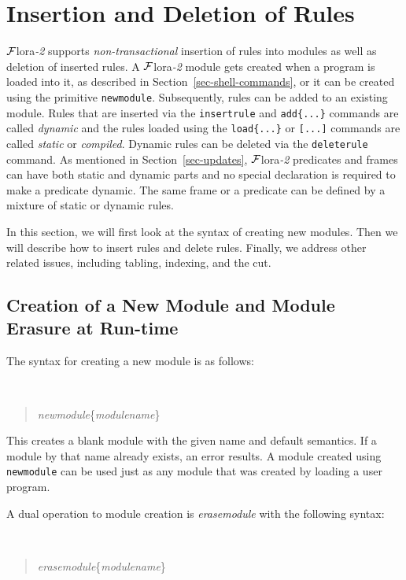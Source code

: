 \documentclass[11pt]{article}
\newcommand{\FLSYSTEM}{{\mbox{\sc ${\cal F}${lora}\rm\emph{-2}}}\xspace}
\begin{document}
\section{Insertion and Deletion of Rules}
\label{sec-rule-update}

\FLSYSTEM supports \emph{non-transactional} insertion of rules into modules as
well as deletion of inserted rules.  A \FLSYSTEM module gets created when a
program is loaded into it, as described in
Section~\ref{sec-shell-commands}, or it can be created using the primitive
{\tt newmodule}. Subsequently, rules can be added to an existing module.
Rules that are inserted via the {\tt insertrule} and {\tt add\{...\}} commands
are called \emph{dynamic} and the rules loaded using the {\tt load\{...\}} or
{\tt [...]} commands are called \emph{static} or \emph{compiled}.  Dynamic
rules can be deleted via the {\tt deleterule} command. As mentioned in
Section~\ref{sec-updates}, \FLSYSTEM predicates and frames can have both
static and dynamic parts and no special declaration is required to make a
predicate dynamic. The same frame or a predicate can be defined by a
mixture of static or dynamic rules.

In this section, we will first look at the syntax of creating new
modules.  Then we will describe how to insert rules and delete
rules. Finally, we address other related issues, including tabling,
indexing, and the cut.


\subsection{Creation of a New Module and Module Erasure at Run-time}


The syntax for creating a new module is as follows:
{\tt
\begin{quote}
\emph{newmodule}\{\emph{modulename}\}
\end{quote}
}
\noindent
This creates a blank module with the given name and default semantics.  If
a module by that name already exists, an error results.  A module created
using {\tt newmodule} can be used just as any module that
was created by loading a user program.

A dual operation to module creation
is \emph{erasemodule} with the following syntax:
{\tt
\begin{quote}
\emph{erasemodule}\{\emph{modulename}\}
\end{quote}
}
\end{document}
